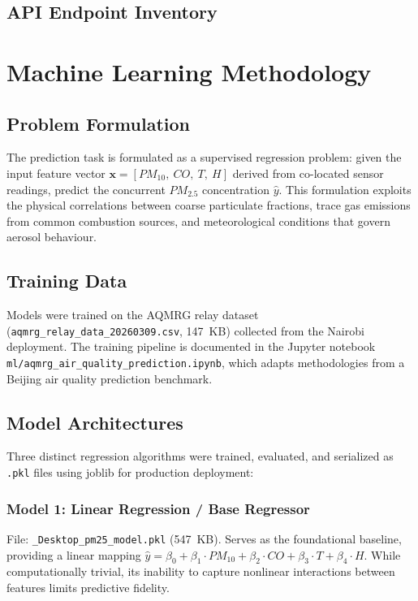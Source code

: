 \figMethodologyIngest

\subsection{API Endpoint Inventory}

\tabMethodologyEndpoints

\section{Machine Learning Methodology}
\label{sec:ml}

\subsection{Problem Formulation}
The prediction task is formulated as a supervised regression problem: given the input feature vector $\mathbf{x} = [PM_{10},\ CO,\ T,\ H]$ derived from co-located sensor readings, predict the concurrent $PM_{2.5}$ concentration $\hat{y}$. This formulation exploits the physical correlations between coarse particulate fractions, trace gas emissions from common combustion sources, and meteorological conditions that govern aerosol behaviour.

\subsection{Training Data}
Models were trained on the AQMRG relay dataset (\texttt{aqmrg\_relay\_data\_20260309.csv}, 147~KB) collected from the Nairobi deployment. The training pipeline is documented in the Jupyter notebook \texttt{ml/aqmrg\_air\_quality\_prediction.ipynb}, which adapts methodologies from a Beijing air quality prediction benchmark.

\figMethodologyTrainingPipeline

\subsection{Model Architectures}
Three distinct regression algorithms were trained, evaluated, and serialized as \texttt{.pkl} files using joblib for production deployment:

\subsubsection{Model 1: Linear Regression / Base Regressor}
File: \texttt{\_Desktop\_pm25\_model.pkl} (547~KB). Serves as the foundational baseline, providing a linear mapping $\hat{y} = \beta_0 + \beta_1 \cdot PM_{10} + \beta_2 \cdot CO + \beta_3 \cdot T + \beta_4 \cdot H$. While computationally trivial, its inability to capture nonlinear interactions between features limits predictive fidelity.


